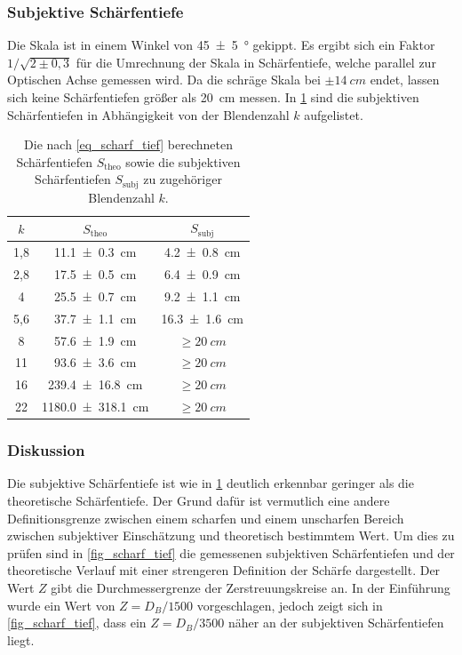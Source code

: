 \documentclass[
	a4paper,
	12pt,
	pagesize,
	ngerman
]{scrartcl}
\begin{document}
	\subsubsection*{Subjektive Schärfentiefe}
	Die Skala ist in einem Winkel von \SI{45+-5}{\degree} gekippt.
	Es ergibt sich ein Faktor $1/\sqrt{2\pm 0,3}$ für die Umrechnung der Skala in Schärfentiefe, welche parallel zur Optischen Achse gemessen wird.
	Da die schräge Skala bei $\pm\SI{14}{cm}$ endet, lassen sich keine Schärfentiefen größer als \SI{20}{cm} messen.
	In \cref{tab_scharf_tief} sind die subjektiven Schärfentiefen in Abhängigkeit von der Blendenzahl $k$ aufgelistet.
	\begin{table}[H]
		\centering
		\begin{tabular}{ c | c | c}
			$k$ 	& $S_\text{theo}$ 		& $S_\text{subj}$ \\ \hline
			1,8 	& \SI{11,1 +- 0,3}{cm} 		& \SI{4,2 +- 0,8}{cm}\\
			2,8 	& \SI{17,5 +- 0,5}{cm}		& \SI{6,4 +- 0,9}{cm} \\
			4 	& \SI{25,5 +- 0,7}{cm}		& \SI{9,2 +- 1,1}{cm} \\
			5,6 	& \SI{37,7 +- 1,1}{cm}		& \SI{16,3 +- 1,6}{cm} \\
			8 	& \SI{57,6 +- 1,9}{cm}		& $\geq\SI{20}{cm}$ \\
			11 	& \SI{93,6 +- 3,6}{cm}		& $\geq\SI{20}{cm}$ \\
			16 	& \SI{239,4 +- 16,8}{cm}	& $\geq\SI{20}{cm}$ \\
			22 	& \SI{1180,0 +- 318,1}{cm}	& $\geq\SI{20}{cm}$ \\
		\end{tabular}
		\caption{Die nach \cref{eq_scharf_tief} berechneten Schärfentiefen $S_\text{theo}$ sowie die subjektiven Schärfentiefen $S_\text{subj}$ zu zugehöriger Blendenzahl $k$. } %
		\label{tab_scharf_tief} 
	\end{table}


	
	\subsubsection{Diskussion}
	Die subjektive Schärfentiefe ist wie in \cref{tab_scharf_tief} deutlich erkennbar geringer als die theoretische Schärfentiefe.
	Der Grund dafür ist vermutlich eine andere Definitionsgrenze zwischen einem scharfen und einem unscharfen Bereich zwischen subjektiver Einschätzung und theoretisch bestimmtem Wert.
	Um dies zu prüfen sind in \cref{fig_scharf_tief} die gemessenen subjektiven Schärfentiefen und der theoretische Verlauf mit einer strengeren Definition der Schärfe dargestellt.
	Der Wert $Z$ gibt die Durchmessergrenze der Zerstreuungskreise an. 
	In der Einführung wurde ein Wert von $Z=D_B/1500$ vorgeschlagen, jedoch zeigt sich in \cref{fig_scharf_tief}, dass ein $Z=D_B/3500$ näher an der subjektiven Schärfentiefen liegt.
\end{document}
